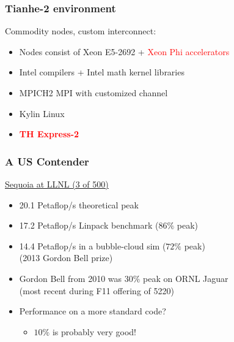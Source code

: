 \documentclass{beamer}
\begin{document}
\begin{frame}
  \frametitle{Tianhe-2 environment}
  
  Commodity nodes, custom interconnect:
  \begin{itemize}
  \item
    Nodes consist of Xeon E5-2692 + \textcolor{red}{Xeon Phi accelerators}
  \item
    Intel compilers + Intel math kernel libraries
  \item
    MPICH2 MPI with customized channel
  \item
    Kylin Linux
  \item
    \textcolor{red}{\bf TH Express-2}
  \end{itemize}
\end{frame}


\begin{frame}
  \frametitle{A US Contender}

  \href{http://www.top500.org/system/177556}{Sequoia at LLNL (3 of 500)}
  \begin{itemize}
  \item 20.1 Petaflop/s theoretical peak
  \item 17.2 Petaflop/s Linpack benchmark ($86\%$ peak)
  \item 14.4 Petaflop/s in a bubble-cloud sim
    ($72\%$ peak) \\
    (2013 Gordon Bell prize)
  \item Gordon Bell from 2010 was $30\%$ peak on ORNL Jaguar \\
    (most recent during F11 offering of 5220)
  \item Performance on a more standard code? 
    \begin{itemize}
    \item $10\%$ is probably very good!
    \end{itemize}
  \end{itemize}
\end{frame}
\end{document}
